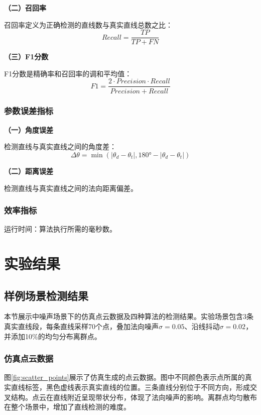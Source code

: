 \documentclass[12pt,a4paper]{article}
\begin{document}
\textbf{（二）召回率}

召回率定义为正确检测的直线数与真实直线总数之比：
\begin{equation}
    Recall = \frac{TP}{TP + FN}
\end{equation}

\textbf{（三）F1分数}

F1分数是精确率和召回率的调和平均值：
\begin{equation}
    F1 = \frac{2 \cdot Precision \cdot Recall}{Precision + Recall}
\end{equation}

\subsubsection{参数误差指标}

\textbf{（一）角度误差}

检测直线与真实直线之间的角度差：
\begin{equation}
    \Delta\theta = \min(|\theta_d - \theta_t|, 180° - |\theta_d - \theta_t|)
\end{equation}

\textbf{（二）距离误差}

检测直线与真实直线之间的法向距离偏差。

\subsubsection{效率指标}

运行时间：算法执行所需的毫秒数。

\section{实验结果}

\subsection{样例场景检测结果}

本节展示中噪声场景下的仿真点云数据及四种算法的检测结果。实验场景包含3条真实直线段，每条直线采样70个点，叠加法向噪声$\sigma=0.05$、沿线抖动$\sigma=0.02$，并添加10\%的均匀分布离群点。

\subsubsection{仿真点云数据}

图\ref{fig:scatter_points}展示了仿真生成的点云数据。图中不同颜色表示点所属的真实直线标签，黑色虚线表示真实直线的位置。三条直线分别位于不同方向，形成交叉结构。点云在直线附近呈现带状分布，体现了法向噪声的影响。离群点均匀散布在整个场景中，增加了直线检测的难度。
\end{document}
